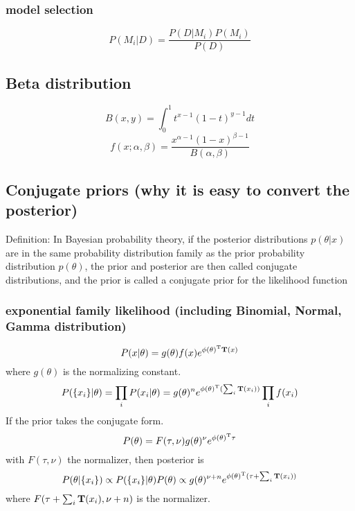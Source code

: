 \documentclass[12pt,a4paper]{article}
\begin{document}
\subsubsection*{model selection}
$$
P(M_i|D) = \frac{P(D|M_i)P(M_i)}{P(D)}
$$
\subsection*{Beta distribution}
$$
B(x,y) = \int_0^1{t^{x-1}(1-t)^{y-1}}dt
$$
$$
f(x;\alpha,\beta) = \frac{x^{\alpha-1}(1-x)^{\beta-1}}{B(\alpha,\beta)}
$$
\subsection*{Conjugate priors (why it is easy to convert the posterior)}
Definition: In Bayesian probability theory, if the posterior distributions $p(\theta | x)$ are in the same probability distribution family as the prior probability distribution $p(\theta)$, the prior and posterior are then called conjugate distributions, and the prior is called a conjugate prior for the likelihood function
\subsubsection*{exponential family likelihood (including Binomial, Normal, Gamma distribution)}
$$
P(x|\theta) = g(\theta)f(x)e^{\phi(\theta)^{\rm T}{\bf T}(x)}
$$
where $g(\theta)$ is the normalizing constant.\\
$$
P(\{x_i\}|\theta) = \prod_{i}P(x_i|\theta) = g(\theta)^ne^{\phi(\theta)^{\rm T}(\sum_{i}{\bf T}(x_i))}
\prod_{i}f(x_i)$$
If the prior takes the conjugate form.
$$P(\theta) = F(\tau,\nu)g(\theta)^{\nu}e^{\phi(\theta)^{\rm T}\tau}$$
with $F(\tau,\nu)$ the normalizer, then posterior is
$$
P(\theta|\{x_i\}) \propto P(\{x_i\}|\theta)P(\theta) \propto g(\theta)^{\nu+n}e^{\phi(\theta)^{\rm T}(\tau+\sum_{i}{\bf T}(x_i))}
$$
where $F(\tau+\sum_i{\bf T}(x_i),\nu+n)$ is the normalizer.
\end{document}
